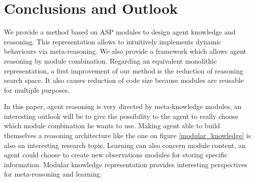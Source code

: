\documentclass{aamas2012}
\begin{document}
\section{Conclusions and Outlook}

	We provide a method based on ASP modules to design agent knowledge and reasoning.
	This representation allows to intuitively implements dynamic behaviours via meta-reasoning.
	We also provide a framework which allows agent reasoning by module combination.
	Regarding an equivalent monolithic representation, a first improvement of our method is the reduction of reasoning search space.
	It also causes reduction of code size because modules are reusable for multiple purposes.
	
	In this paper, agent reasoning is very directed by meta-knowledge modules, 
	an interesting outlook will be to give the possibility to the agent to really choose which module combination he wants to use.
	Making agent able to build themselves a reasoning architecture like the one on figure \ref{modular_knowledge} is also an interesting research topic.
	Learning can also concern module content, an agent could choose to create new observations modules for storing specific information.
	Modular knowledge representation provides interesting perspectives for meta-reasoning and learning.
%

%
%

\end{document}
